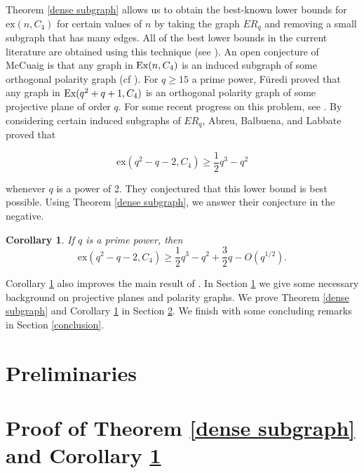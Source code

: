 \documentclass[12pt]{article}
\newtheorem{corollary}[theorem]{Corollary}
\begin{document}
Theorem \ref{dense subgraph} allows us to obtain the best-known lower bounds for $\mathrm{ex}(n, C_4)$ for certain values of $n$ by taking the graph $ER_q$ and removing a small subgraph that has many edges.  All of the best lower bounds in the current literature are obtained using this technique (see \cite{abl, fknw, tt}).  An open conjecture of McCuaig is that
any graph in $\textup{Ex}(n , C_4)$ is an induced subgraph of some orthogonal polarity graph (cf \cite{fu1994}).  For $q \geq 15$ a prime power, F\"{u}redi \cite{fu1996} proved that any graph in $\textup{Ex}( q^2 + q + 1 , C_4)$ is an orthogonal polarity graph of some projective plane of order $q$.  For some recent progress on this problem, see \cite{fknw}.
By considering certain induced subgraphs of $ER_q$, Abreu, Balbuena, and Labbate \cite{abl} proved that

$$\mathrm{ex}(q^2-q-2, C_4) \geq \frac{1}{2}q^3 - q^2$$

whenever $q$ is a power of 2.  They conjectured that this lower bound is best possible.
Using Theorem \ref{dense subgraph}, we answer their conjecture in the negative.

\begin{corollary}\label{abl conjecture}
    If $q$ is a prime power, then
    $$\mathrm{ex}(q^2 - q - 2, C_4) \geq \frac{1}{2}q^3 - q^2 + \frac{3}{2}q - O\left(q^{1/2}\right).$$
\end{corollary}

Corollary \ref{abl conjecture} also improves the main result of \cite{tt}.
In Section \ref{preliminaries} we give some necessary background on projective planes and polarity graphs. We prove
Theorem \ref{dense subgraph} and Corollary \ref{abl conjecture} in Section \ref{proofs}.  We finish with some concluding remarks in Section \ref{conclusion}.

\section{Preliminaries}\label{preliminaries}
\section{Proof of Theorem \ref{dense subgraph} and Corollary \ref{abl conjecture}}\label{proofs}
\end{document}

